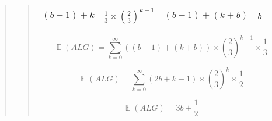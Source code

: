 \documentclass{article}
\begin{document}
\begin{quote}
\begin{quote}
\begin{center}
\begin{tabular}{ | c | c | c | c |}
			 		$(b-1)+k$   &  $\frac{1}{3}\times (\frac{2}{3})^{k-1} $  &  $(b-1)+(k+b)$     &   $b$ \\			 		
			 		

				
			 	
			 	\hline 
			 

			 
			\end{tabular}
		\end{center}
		

		$$\mathop{\mathbb{E}}(ALG)= \sum_{k=0}^{\infty}((b-1) + (k+b) )\times (\frac{2}{3})^{k-1} \times  \frac{1}{3}$$
		
		$$\mathop{\mathbb{E}}(ALG)= \sum_{k=0}^{\infty}(2b+k-1 )\times (\frac{2}{3})^{k} \times  \frac{1}{2}$$
		
		$$\mathop{\mathbb{E}}(ALG)=3b + \frac{1}{2}$$
		\end{quote}
	\end{quote}







\newpage



\end{document}
